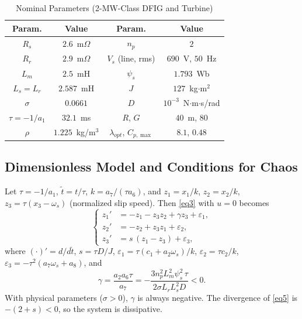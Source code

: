 \documentclass[conference]{IEEEtran}
\begin{document}
\begin{table}[htbp]
\caption{Nominal Parameters (2-MW-Class DFIG and Turbine)}
\begin{center}
\begin{tabular}{|c|c||c|c|}
\hline
\textbf{Param.} & \textbf{Value} & \textbf{Param.} & \textbf{Value} \\
\hline
$R_{s}$ & $2.6$~m$\Omega$ & $n_p$ & $2$ \\
$R_{r}$ & $2.9$~m$\Omega$ & $V_s$ (line, rms) & $690$~V, $50$~Hz \\
$L_{m}$ & $2.5$~mH & $\psi_s$ & $1.793$~Wb \\
$L_{s}=L_r$ & $2.587$~mH & $J$ & $127$~kg$\cdot$m$^2$ \\
$\sigma$ & $0.0661$ & $D$ & $10^{-3}$~N$\cdot$m$\cdot$s/rad \\
$\tau=-1/a_1$ & $32.1$~ms & $R$, $G$ & $40$~m, $80$ \\
$\rho$ & $1.225$~kg/m$^3$ & $\lambda_{opt}$, $C_{p,\max}$ & $8.1$, $0.48$ \\
\hline
\end{tabular}
\label{tab1}
\end{center}
\end{table}

\subsection{Dimensionless Model and Conditions for Chaos}

Let $\tau=-1/a_1$, $\tilde t=t/\tau$, $k=a_7/(\tau a_6)$, and $z_1=x_1/k$, $z_2=x_2/k$, $z_3=\tau(x_3-\omega_s)$ (normalized slip speed). Then \eqref{eq3} with $u=0$ becomes
\begin{equation}
\left\{ \begin{aligned}
z_1' &= -z_1 - z_3z_2 + \gamma z_3 + \varepsilon_1,\\
z_2' &= -z_2 + z_3z_1 + \varepsilon_2,\\
z_3' &= s\,(z_1 - z_3) + \varepsilon_3,
\end{aligned}\right.
\label{eq5}
\end{equation}
where $(\cdot)'=d/d\tilde t$, $s=\tau D/J$, $\varepsilon_1=\tau(c_1+a_2\omega_s)/k$, $\varepsilon_2=\tau c_2/k$, $\varepsilon_3=-\tau^2(a_7\omega_s+a_8)$, and
\begin{equation}
\gamma = \frac{a_2a_6\tau}{a_7} = -\frac{3n_p^2L_m^2\psi_s^2\,\tau}{2\sigma L_rL_s^2D} < 0 .
\label{eq6}
\end{equation}
With physical parameters ($\sigma>0$), $\gamma$ is always negative. The divergence of \eqref{eq5} is $-(2+s)<0$, so the system is dissipative.
\end{document}
